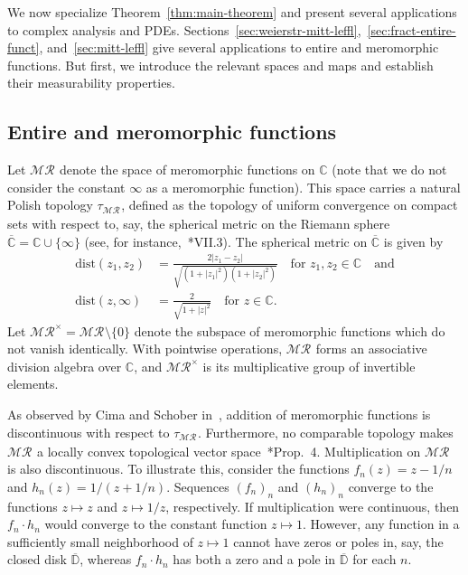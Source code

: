 \documentclass[12pt]{paper}
\numberwithin{equation}{section}
\theoremstyle{plain}
\theoremstyle{definition}
\newcommand{\C}{\mathbb{C}}
\newcommand{\Cbar}{\overline{\mathbb{C}}}
\renewcommand{\Dbar}{\overline{\mathbb{D}}}
\newcommand{\merom}[1][]{\mathcal{MR}_{#1}}
\newcommand{\meromnz}{\merom^{\times}}
\newcommand{\dist}{\textrm{dist}}
\begin{document}
We now specialize Theorem~\ref{thm:main-theorem} and present several applications to complex
analysis and PDEs. Sections~\ref{sec:weierstr-mitt-leffl},~\ref{sec:fract-entire-funct},
and~\ref{sec:mitt-leffl} give several applications to entire and meromorphic functions. But first,
we introduce the relevant spaces and maps and establish their measurability properties.

\subsection{Entire and meromorphic functions}
\label{sec:merom-entire-functions}

Let \(\merom\) denote the space of meromorphic functions on \(\C\) (note that we do not consider the
constant \(\infty\) as a meromorphic function).  This space carries a natural Polish topology
\(\tau_{\merom}\), defined as the topology of uniform convergence on compact sets with respect to,
say, the spherical metric on the Riemann sphere \(\Cbar = \C \cup \{\infty\}\) (see, for
instance,~\cite{conwayFunctionsOneComplex1978}*{VII.3}).  The spherical metric on \(\Cbar\) is given
by
\begin{displaymath}
  \begin{aligned}
    \dist(z_{1}, z_{2})
    &= \frac{2|z_{1} - z_{2}|}{\sqrt{(1+|z_{1}|^{2})(1+|z_{2}|^{2})}} \quad
      \textrm{for } z_{1}, z_{2} \in \C \quad \textrm{and} \\
    \dist(z, \infty) &= \frac{2}{\sqrt{1+|z|^{2}}} \quad \textrm{for } z \in \C.
  \end{aligned}
\end{displaymath}
Let \(\meromnz = \merom \setminus \{0\}\) denote the subspace of meromorphic functions which do not
vanish identically. With pointwise operations, \(\merom\) forms an associative division algebra over
\(\C\), and \(\meromnz\) is its multiplicative group of invertible elements.

As observed by Cima and Schober in~\cite{cimaSpacesMeromorphicFunctions1979}, addition of
meromorphic functions is discontinuous with respect to \(\tau_{\merom}\). Furthermore, no comparable
topology makes \(\merom\) a locally convex topological vector
space~\cite{cimaSpacesMeromorphicFunctions1979}*{Prop.~4}.  Multiplication on \(\merom\) is also
discontinuous. To illustrate this, consider the functions \(f_{n}(z) = z - 1/n\) and
\(h_{n}(z) = 1/(z + 1/n)\).  Sequences \((f_{n})_{n}\) and \((h_{n})_{n}\) converge to the functions
\(z \mapsto z\) and \(z \mapsto 1/z\), respectively. If multiplication were continuous, then
\(f_{n} \cdot h_{n}\) would converge to the constant function \(z \mapsto 1\).  However, any
function in a sufficiently small neighborhood of \(z \mapsto 1\) cannot have zeros or poles in, say,
the closed disk \(\Dbar\), whereas \(f_{n} \cdot h_{n}\) has both a zero and a pole in \(\Dbar\) for
each \(n\).
\end{document}
